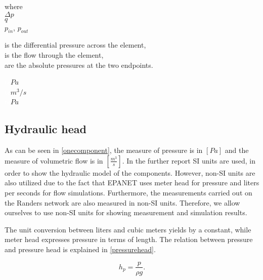  \begin{minipage}[t]{0.20\textwidth}
where\\
\hspace*{8mm} $\Delta p$ \\
\hspace*{8mm} $q$ \\
\hspace*{8mm} $p_{in}$, $p_{out}$ 
\end{minipage}
\begin{minipage}[t]{0.68\textwidth}
\vspace*{2mm}
is the differential pressure across the element,\\
is the flow through the element,\\
are the absolute pressures at the two endpoints.
\end{minipage}
\begin{minipage}[t]{0.10\textwidth}
\vspace*{2mm}
\textcolor{White}{te}$\unit{Pa}$\\
\textcolor{White}{te}$\unit{m^3/s}$\\
\textcolor{White}{te}$\unit{Pa}$
\end{minipage}

\subsection{Hydraulic head}
\label{hydraulic_head}

As can be seen in \eqref{onecomponent}, the measure of pressure is in $[Pa]$ and the measure of volumetric flow is in $[\frac{m^3}{s}]$. In the further report SI units are used, in order to show the hydraulic model of the components. However, non-SI units are also utilized due to the fact that EPANET uses meter head for pressure and liters per seconds for flow simulations. Furthermore, the measurements carried out on the Randers network are also measured in non-SI units. Therefore, we allow ourselves to use non-SI units for showing measurement and simulation results. 

The unit conversion between liters and cubic meters yields by a constant, while meter head expresses pressure in terms of length. The relation between pressure and pressure head is explained in \eqref{pressurehead}. 

\begin{equation}
\label{pressurehead}
  h_p = \frac{p}{\rho g}.
\end{equation} 

